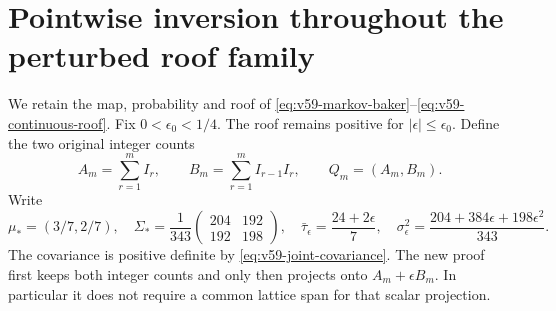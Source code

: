 \section{Pointwise inversion throughout the perturbed roof family}
\label{sec:v60-perturbed-density}
We retain the map, probability and roof of
\eqref{eq:v59-markov-baker}--\eqref{eq:v59-continuous-roof}.
Fix $0<\epsilon_0<1/4$. The roof remains positive for
$|\epsilon|\le\epsilon_0$. Define the two original integer counts
\[
 A_m=\sum_{r=1}^m I_r,\qquad
 B_m=\sum_{r=1}^m I_{r-1}I_r,\qquad Q_m=(A_m,B_m).
\]
Write
\begin{equation}\label{eq:v60-joint-data}
 \mu_*=(3/7,2/7),\quad
 \Sigma_*=\frac{1}{343}\begin{pmatrix}204&192\\192&198\end{pmatrix},\quad
 \bar\tau_\epsilon=\frac{24+2\epsilon}{7},\quad
 \sigma_\epsilon^2=\frac{204+384\epsilon+198\epsilon^2}{343}.
\end{equation}
The covariance is positive definite by
\eqref{eq:v59-joint-covariance}. The new proof first keeps both integer
counts and only then projects onto $A_m+\epsilon B_m$. In particular it
does not require a common lattice span for that scalar projection.

